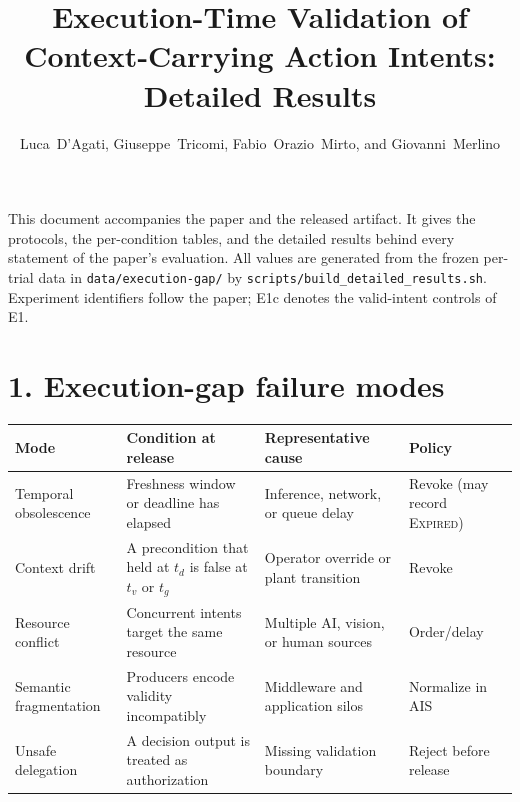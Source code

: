 \documentclass[11pt]{article}
\title{Execution-Time Validation of Context-Carrying Action Intents:\\ Detailed Results}
\date{}
\author{Luca~D'Agati, Giuseppe~Tricomi, Fabio~Orazio~Mirto, and Giovanni~Merlino}
\begin{document}
\maketitle

\noindent This document accompanies the paper and the released artifact. It gives the protocols, the per-condition tables, and the detailed results behind every statement of the paper's evaluation. All values are generated from the frozen per-trial data in \texttt{data/execution-gap/} by \texttt{scripts/build\_detailed\_results.sh}. Experiment identifiers follow the paper; E1c denotes the valid-intent controls of E1.

\section*{1. Execution-gap failure modes}
\begin{center}\small
\begin{tabularx}{\linewidth}{@{}lYYl@{}}
\toprule
\textbf{Mode} & \textbf{Condition at release} & \textbf{Representative cause} & \textbf{Policy} \\
\midrule
Temporal obsolescence & Freshness window or deadline has elapsed & Inference, network, or queue delay & Revoke (may record \textsc{Expired}) \\
Context drift & A precondition that held at $t_d$ is false at $t_v$ or $t_g$ & Operator override or plant transition & Revoke \\
Resource conflict & Concurrent intents target the same resource & Multiple AI, vision, or human sources & Order/delay \\
Semantic fragmentation & Producers encode validity incompatibly & Middleware and application silos & Normalize in AIS \\
Unsafe delegation & A decision output is treated as authorization & Missing validation boundary & Reject before release \\
\bottomrule
\end{tabularx}
\end{center}
\end{document}
